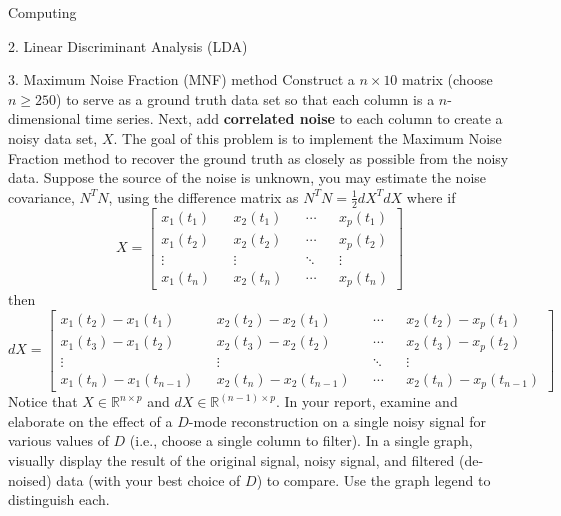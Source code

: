 \begin{section}{Computing}
\begin{homeworkSection}{2. Linear Discriminant Analysis (LDA)}

\end{homeworkSection}

\newpage
\begin{homeworkSection}{3. Maximum Noise Fraction (MNF) method}
Construct a $n \times 10$ matrix (choose $n \geq 250$) to serve as a ground truth data set so that each column is a
$n$-dimensional time series. Next, add \textbf{correlated noise} to each column to create a noisy data set, $X$. The
goal of this problem is to implement the Maximum Noise Fraction method to recover the ground truth as
closely as possible from the noisy data. Suppose the source of the noise is unknown, you may estimate
the noise covariance, $N^TN$, using the difference matrix as $N^T N = \frac{1}{2} dX^TdX$ where if
$$
    X = \begin{bmatrix}
        x_1(t_1)  &&  x_2(t_1) && \cdots && x_p(t_1) \\
        x_1(t_2)  &&  x_2(t_2) && \cdots && x_p(t_2) \\
        \vdots    && \vdots    && \ddots && \vdots \\
        x_1(t_n)  &&  x_2(t_n) && \cdots && x_p(t_n)
    \end{bmatrix}
$$
then
$$
    dX = \begin{bmatrix}
        x_1(t_2)-x_1(t_1)  &&  x_2(t_2)-x_2(t_1) && \cdots && x_2(t_2) - x_p(t_1) \\
        x_1(t_3)-x_1(t_2)  &&  x_2(t_3)-x_2(t_2) && \cdots && x_2(t_3) - x_p(t_2) \\
        \vdots    && \vdots    && \ddots && \vdots \\
        x_1(t_n)-x_1(t_{n-1})  &&  x_2(t_n)-x_2(t_{n-1}) && \cdots && x_2(t_n) - x_p(t_{n-1})
    \end{bmatrix}
$$
Notice that $X \in \mathbb{R}^{n \times p}$ and $dX \in \mathbb{R}^{(n-1) \times p}$.
In your report, examine and elaborate on the effect of a $D$-mode
reconstruction on a single noisy signal for various values of $D$ (i.e., choose a single column to filter). In
a single graph, visually display the result of the original signal, noisy signal, and filtered (de-noised) data
(with your best choice of $D$) to compare. Use the graph legend to distinguish each.

\end{homeworkSection}

\end{section}
\newpage

